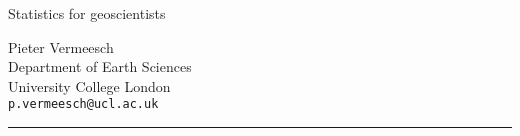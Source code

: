 \documentclass[11pt]{book}
\begin{document}
\begin{titlepage}
  
  \parbox[t]{0.93\textwidth}{
    \parbox[t]{0.91\textwidth}{
      \raggedleft
      \fontsize{50pt}{80pt}
      \vspace{0.7cm}
      \Huge
      Statistics for geoscientists\\
      
      \vspace{0.7cm}
    }
  }
  
  \vfill	
  \parbox[t]{0.93\textwidth}{
    \raggedleft
    \large
        {\Large Pieter Vermeesch}\\[4pt]
        Department of Earth Sciences\\
        University College London\\[4pt]
        \texttt{p.vermeesch@ucl.ac.uk}\\
	
        \hfill\rule{0.2\linewidth}{1pt}
}
	
\end{titlepage}

\tableofcontents


































\end{document}
